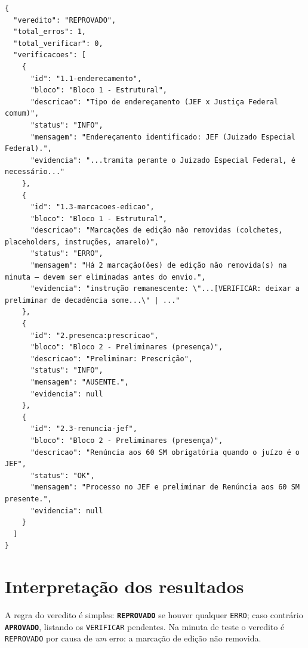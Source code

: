 \documentclass[11pt,a4paper]{article}
\newcommand{\status}[1]{\texttt{#1}}
\begin{document}
\begin{lstlisting}[style=json]
{
  "veredito": "REPROVADO",
  "total_erros": 1,
  "total_verificar": 0,
  "verificacoes": [
    {
      "id": "1.1-enderecamento",
      "bloco": "Bloco 1 - Estrutural",
      "descricao": "Tipo de endereçamento (JEF x Justiça Federal comum)",
      "status": "INFO",
      "mensagem": "Endereçamento identificado: JEF (Juizado Especial Federal).",
      "evidencia": "...tramita perante o Juizado Especial Federal, é necessário..."
    },
    {
      "id": "1.3-marcacoes-edicao",
      "bloco": "Bloco 1 - Estrutural",
      "descricao": "Marcações de edição não removidas (colchetes, placeholders, instruções, amarelo)",
      "status": "ERRO",
      "mensagem": "Há 2 marcação(ões) de edição não removida(s) na minuta — devem ser eliminadas antes do envio.",
      "evidencia": "instrução remanescente: \"...[VERIFICAR: deixar a preliminar de decadência some...\" | ..."
    },
    {
      "id": "2.presenca:prescricao",
      "bloco": "Bloco 2 - Preliminares (presença)",
      "descricao": "Preliminar: Prescrição",
      "status": "INFO",
      "mensagem": "AUSENTE.",
      "evidencia": null
    },
    {
      "id": "2.3-renuncia-jef",
      "bloco": "Bloco 2 - Preliminares (presença)",
      "descricao": "Renúncia aos 60 SM obrigatória quando o juízo é o JEF",
      "status": "OK",
      "mensagem": "Processo no JEF e preliminar de Renúncia aos 60 SM presente.",
      "evidencia": null
    }
  ]
}
\end{lstlisting}

\section{Interpretação dos resultados}

A regra do veredito é simples: \textbf{\status{REPROVADO}} se houver qualquer
\status{ERRO}; caso contrário \textbf{\status{APROVADO}}, listando os
\status{VERIFICAR} pendentes. Na minuta de teste o veredito é
\status{REPROVADO} por causa de \emph{um} erro: a marcação de edição não
removida.
\end{document}
